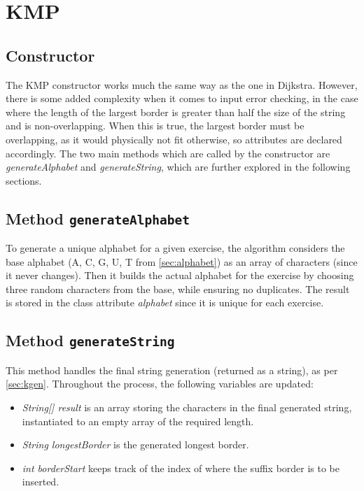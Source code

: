 \documentclass{l4proj}
\begin{document}
\section{KMP}

\subsection{Constructor}

The KMP constructor works much the same way as the one in Dijkstra. However, there is some added complexity when it comes to input error checking, in the case where the length of the largest border is greater than half the size of the string and is non-overlapping. When this is true, the largest border must be overlapping, as it would physically not fit otherwise, so attributes are declared accordingly. The two main methods which are called by the constructor are \emph{generateAlphabet} and \emph{generateString}, which are further explored in the following sections.

\subsection{Method \texttt{generateAlphabet}}

To generate a unique alphabet for a given exercise, the algorithm considers the base alphabet (A, C, G, U, T from \autoref{sec:alphabet}) as an array of characters (since it never changes). Then it builds the actual alphabet for the exercise by choosing three random characters from the base, while ensuring no duplicates. The result is stored in the class attribute \emph{alphabet} since it is unique for each exercise.

\subsection{Method \texttt{generateString}}

This method handles the final string generation (returned as a string), as per \autoref{sec:kgen}. Throughout the process, the following variables are updated:

\begin{itemize}
	\item
	\emph{String[] result} is an array storing the characters in the final generated string, instantiated to an empty array of the required length.
	\item
	\emph{String longestBorder} is the generated longest border.
	\item
	\emph{int borderStart} keeps track of the index of where the suffix border is to be inserted.
\end{itemize}
\end{document}
